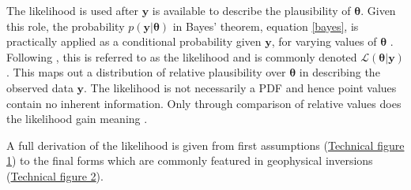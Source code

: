 The likelihood is used after $\bm{y}$ is available to describe the plausibility of $\bm{\theta}$. Given this role, the probability $p(\bm{y}|\bm{\theta})$ in Bayes' theorem, equation \ref{bayes}, is practically applied as a conditional probability given $\bm{y}$, for varying values of $\bm{\theta}$ \citep[p.10]{Box1973}. Following \citet{Fisher1922}, this is referred to as the likelihood and is commonly denoted $\mathcal{L}(\bm{\theta}|\bm{y})$. This maps out a distribution of relative plausibility over $\bm{\theta}$ in describing the observed data $\bm{y}$. The likelihood is not necessarily a PDF and hence point values contain no inherent information. Only through comparison of relative values does the likelihood gain meaning \citep[p.11]{Box1973}.\par


A full derivation of the likelihood is given from first assumptions (\hyperref[tf1]{Technical figure 1}) to the final forms which are commonly featured in geophysical inversions (\hyperref[tf1]{Technical figure 2}).\par


